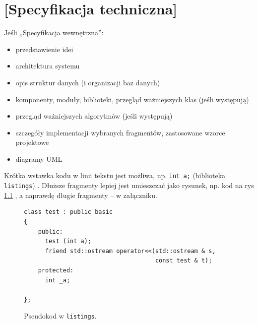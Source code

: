 \documentclass[a4paper,twoside,12pt]{book}
\begin{document}
\chapter{[Specyfikacja techniczna]}
\label{ch:05}


Jeśli „Specyfikacja wewnętrzna”:
\begin{itemize}
\item przedstawienie idei
\item architektura systemu
\item opis struktur danych (i organizacji baz danych)
\item komponenty, moduły, biblioteki, przegląd ważniejszych klas (jeśli występują)
\item przegląd ważniejszych algorytmów (jeśli występują)
\item szczegóły implementacji wybranych fragmentów, zastosowane wzorce projektowe
\item diagramy UML
\end{itemize}



Krótka wstawka kodu w linii tekstu jest możliwa, np.  \lstinline|int a;| (biblioteka \texttt{listings})%
. 
Dłuższe fragmenty lepiej jest umieszczać jako rysunek, np. kod na rys \ref{fig:pseudokod:listings}%
, a naprawdę długie fragmenty – w załączniku.


\begin{figure}
\centering
\begin{lstlisting}
class test : public basic
{
    public:
      test (int a);
      friend std::ostream operator<<(std::ostream & s, 
                                     const test & t);
    protected:
      int _a;  
      
};
\end{lstlisting}
\caption{Pseudokod w \texttt{listings}.}
\label{fig:pseudokod:listings}
\end{figure}

%      
\end{document}
